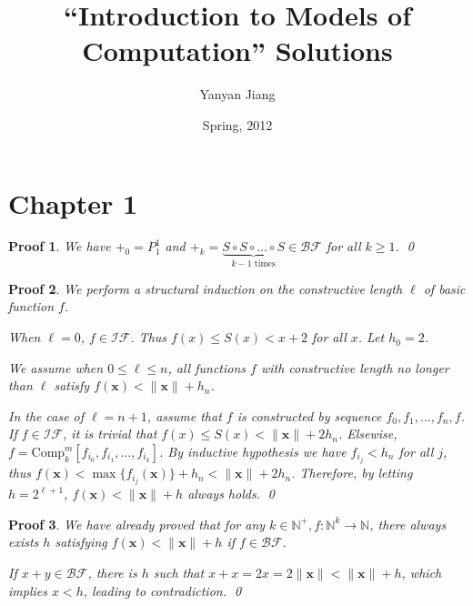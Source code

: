 \documentclass[11pt]{article}
\begin{document}
\newtheorem{thm}{定理}
\newtheorem{deff}[thm]{定义}
\newtheorem*{pf}{Proof}
\newtheorem{lem}[thm]{引理}

\title{\hei \bf ``Introduction to Models of Computation'' Solutions}
\author {Yanyan Jiang}
\date{\kai Spring, 2012}

\maketitle

\section{Chapter 1}

\begin{pf} \rm We have $+_0 = P_1^1$ and
$+_k=\underbrace{S\circ S\circ \ldots \circ S}_{\textrm{$k-1$ times}}\in\mathcal{BF}$
for all $k\geq 1$. \qed
\end{pf}

\begin{pf} \rm
We perform a structural induction on the constructive length $\ell$ of basic function $f$.

When $\ell=0$, $f\in\mathcal{IF}$. Thus $f(x) \leq S(x) < x + 2$ for all $x$.
Let $h_0 = 2$.

We assume when $0\leq \ell \leq n$, all functions $f$ with constructive length
no longer than $\ell$ satisfy $f(\mathbf{x})<\|\mathbf{x}\|+h_n$.

In the case of $\ell = n + 1$, assume that $f$ is constructed by sequence $f_0,f_1,\ldots,f_n,f$.
If $f\in\mathcal{IF}$, it is trivial that $f(x) \leq S(x) < \|\mathbf{x}\|+2h_{n}$.
Elsewise, $f = \textrm{Comp}^m_k[f_{i_0},f_{i_1},\ldots,f_{i_k}]$.
By inductive hypothesis we have $f_{i_j} < h_n$ for all $j$, thus
$f(\mathbf{x}) < \max\{f_{i_j}(\mathbf{x})\} + h_n < \|\mathbf{x}\| + 2h_n$.
Therefore, by letting $h=2^{\ell + 1}$,  $f(\mathbf{x})<\|\mathbf{x}\|+h$ always
holds. \qed

\end{pf}

\begin{pf} \rm
 We have already proved that for any $k\in\mathbb{N}^+, f:\mathbb{N}^k\to\mathbb{N}$,
there always exists $h$ satisfying $f(\mathbf{x})<\|\mathbf{x}\|+h$ if $f\in\mathcal{BF}$.

If $x+y\in\mathcal{BF}$, there is $h$ such that
$x + x = 2x = 2\|\mathbf{x}\| < \|\mathbf{x}\| + h$,
which implies $x < h$, leading to contradiction. \qed

\end{pf}
\end{document}
